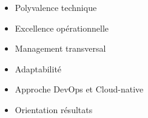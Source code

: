 %
%
%

\twocolumnsection
{
\begin{skills}
\end{skills}}
{
\vspace{1em}
\begin{itemize}
	\item Polyvalence technique
	\item Excellence opérationnelle                    
    \item Management transversal
    \item Adaptabilité
    \item Approche DevOps et Cloud-native
    \item Orientation résultats
\end{itemize}
}
